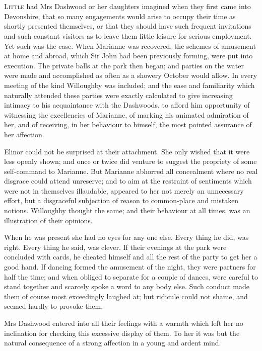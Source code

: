 \chapter[Chapter \thechapter]{}
\lettrine[lraise=0.3]{L}{ittle} had Mrs Dashwood or her daughters imagined when they first came into Devonshire, that so many engagements would arise to occupy their time as shortly presented themselves, or that they should have such frequent invitations and such constant visitors as to leave them little leisure for serious employment. Yet such was the case. When Marianne was recovered, the schemes of amusement at home and abroad, which Sir John had been previously forming, were put into execution. The private balls at the park then began; and parties on the water were made and accomplished as often as a showery October would allow. In every meeting of the kind Willoughby was included; and the ease and familiarity which naturally attended these parties were exactly calculated to give increasing intimacy to his acquaintance with the Dashwoods, to afford him opportunity of witnessing the excellencies of Marianne, of marking his animated admiration of her, and of receiving, in her behaviour to himself, the most pointed assurance of her affection.

Elinor could not be surprised at their attachment. She only wished that it were less openly shown; and once or twice did venture to suggest the propriety of some self-command to Marianne. But Marianne abhorred all concealment where no real disgrace could attend unreserve; and to aim at the restraint of sentiments which were not in themselves illaudable, appeared to her not merely an unnecessary effort, but a disgraceful subjection of reason to common-place and mistaken notions. Willoughby thought the same; and their behaviour at all times, was an illustration of their opinions.

When he was present she had no eyes for any one else. Every thing he did, was right. Every thing he said, was clever. If their evenings at the park were concluded with cards, he cheated himself and all the rest of the party to get her a good hand. If dancing formed the amusement of the night, they were partners for half the time; and when obliged to separate for a couple of dances, were careful to stand together and scarcely spoke a word to any body else. Such conduct made them of course most exceedingly laughed at; but ridicule could not shame, and seemed hardly to provoke them.

Mrs Dashwood entered into all their feelings with a warmth which left her no inclination for checking this excessive display of them. To her it was but the natural consequence of a strong affection in a young and ardent mind.

